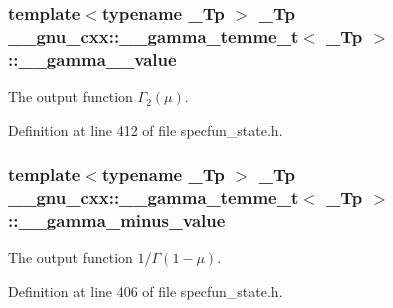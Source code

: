 \subsubsection[{\texorpdfstring{\+\_\+\+\_\+gamma\+\_\+2\+\_\+value}{__gamma_2_value}}]{\setlength{\rightskip}{0pt plus 5cm}template$<$typename \+\_\+\+Tp $>$ \+\_\+\+Tp {\bf \+\_\+\+\_\+gnu\+\_\+cxx\+::\+\_\+\+\_\+gamma\+\_\+temme\+\_\+t}$<$ \+\_\+\+Tp $>$\+::\+\_\+\+\_\+gamma\+\_\+\_\+value}\hypertarget{struct____gnu__cxx_1_1____gamma__temme__t_af3113befce3b6bc9c561472fbaff4520}{}\label{struct____gnu__cxx_1_1____gamma__temme__t_af3113befce3b6bc9c561472fbaff4520}


The output function $ \Gamma_2(\mu) $. 



Definition at line 412 of file specfun\+\_\+state.\+h.

\subsubsection[{\texorpdfstring{\+\_\+\+\_\+gamma\+\_\+minus\+\_\+value}{__gamma_minus_value}}]{\setlength{\rightskip}{0pt plus 5cm}template$<$typename \+\_\+\+Tp $>$ \+\_\+\+Tp {\bf \+\_\+\+\_\+gnu\+\_\+cxx\+::\+\_\+\+\_\+gamma\+\_\+temme\+\_\+t}$<$ \+\_\+\+Tp $>$\+::\+\_\+\+\_\+gamma\+\_\+minus\+\_\+value}\hypertarget{struct____gnu__cxx_1_1____gamma__temme__t_afc5c8fbbc48bdb065bc425e53605dc3c}{}\label{struct____gnu__cxx_1_1____gamma__temme__t_afc5c8fbbc48bdb065bc425e53605dc3c}


The output function $ 1/\Gamma(1 - \mu) $. 



Definition at line 406 of file specfun\+\_\+state.\+h.

